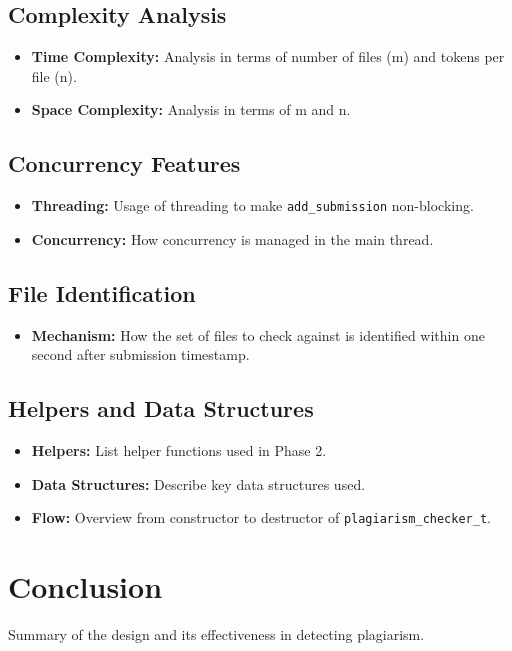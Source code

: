 \documentclass[12pt]{article}
\begin{document}
\subsection{Complexity Analysis}
\begin{itemize}[noitemsep]
    \item \textbf{Time Complexity:} Analysis in terms of number of files (m) and tokens per file (n).
    \item \textbf{Space Complexity:} Analysis in terms of m and n.
\end{itemize}

\subsection{Concurrency Features}
\begin{itemize}[noitemsep]
    \item \textbf{Threading:} Usage of threading to make \texttt{add\_submission} non-blocking.
    \item \textbf{Concurrency:} How concurrency is managed in the main thread.
\end{itemize}

\subsection{File Identification}
\begin{itemize}[noitemsep]
    \item \textbf{Mechanism:} How the set of files to check against is identified within one second after submission timestamp.
\end{itemize}

\subsection{Helpers and Data Structures}
\begin{itemize}[noitemsep]
    \item \textbf{Helpers:} List helper functions used in Phase 2.
    \item \textbf{Data Structures:} Describe key data structures used.
    \item \textbf{Flow:} Overview from constructor to destructor of \texttt{plagiarism\_checker\_t}.
\end{itemize}

\section{Conclusion}
Summary of the design and its effectiveness in detecting plagiarism.
\end{document}
